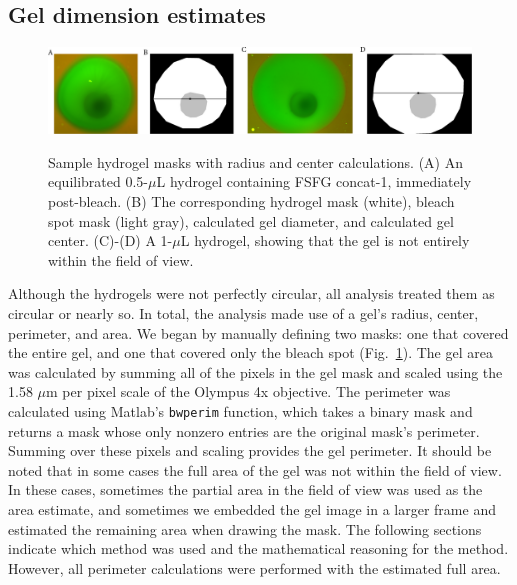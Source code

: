 \subsection{Gel dimension estimates}
\label{sec:gel-dim}

\begin{figure}[t!]
\caption[Hydrogel masks with radius and center calculations.]{Sample hydrogel masks with radius and center calculations.  (A) An equilibrated 0.5-$\mu$L hydrogel containing FSFG concat-1, immediately post-bleach. (B) The corresponding hydrogel mask (white), bleach spot mask (light gray), calculated gel diameter, and calculated gel center. (C)-(D) A 1-$\mu$L hydrogel, showing that the gel is not entirely within the field of view.}
\centering
\includegraphics[width=\textwidth]{figs/ch04/geometry.pdf}
\label{fig:masks}
\end{figure} 

Although the hydrogels were not perfectly circular, all analysis treated them as circular or nearly so.  In total, the analysis made use of a gel's radius, center, perimeter, and area.  We began by manually defining two masks: one that covered the entire gel, and one that covered only the bleach spot (Fig.~\ref{fig:masks}).  The gel area was calculated by summing all of the pixels in the gel mask and scaled using the 1.58 $\mu$m per pixel scale of the Olympus 4x objective.  The perimeter was calculated using Matlab's \texttt{bwperim} function, which takes a binary mask and returns a mask whose only nonzero entries are the original mask's perimeter.  Summing over these pixels and scaling provides the gel perimeter.  It should be noted that in some cases the full area of the gel was not within the field of view.  In these cases, sometimes the partial area in the field of view was used as the area estimate, and sometimes we embedded the gel image in a larger frame and estimated the remaining area when drawing the mask.  The following sections indicate which method was used and the mathematical reasoning for the method.  However, all perimeter calculations were performed with the estimated full area.

